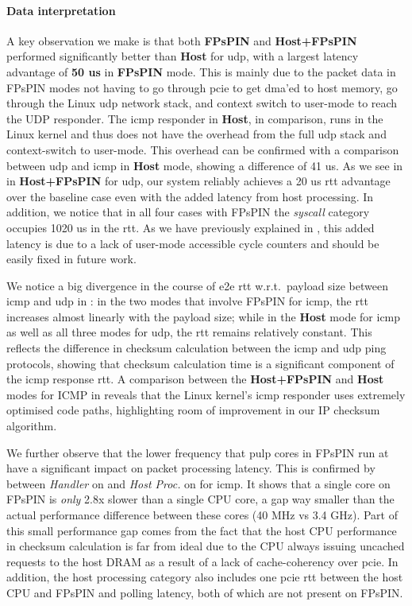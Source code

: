 \paragraph{Data interpretation} A key observation we make is that both \textbf{FPsPIN} and \textbf{Host+FPsPIN} performed significantly better than \textbf{Host} for \ac{udp}, with a largest latency advantage of \textbf{50 us} in \textbf{FPsPIN} mode.  This is mainly due to the packet data in FPsPIN modes not having to go through \ac{pcie} to get \ac{dma}'ed to host memory, go through the Linux \ac{udp} network stack, and context switch to user-mode to reach the UDP responder.  The \ac{icmp} responder in \textbf{Host}, in comparison, runs in the Linux kernel and thus does not have the overhead from the full \ac{udp} stack and context-switch to user-mode.  This overhead can be confirmed with a comparison between \ac{udp} and \ac{icmp} in \textbf{Host} mode, showing a difference of \mytilde{}41 us.  As we see in  in \textbf{Host+FPsPIN} for \ac{udp}, our system reliably achieves a \mytilde{}20 us \ac{rtt} advantage over the baseline case even with the added latency from host processing.  In addition, we notice that in all four cases with FPsPIN the \emph{syscall} category occupies 10\mytilde{}20 us in the \ac{rtt}.  As we have previously explained in , this added latency is due to a lack of user-mode accessible cycle counters and should be easily fixed in future work.

We notice a big divergence in the course of \ac{e2e} \ac{rtt} w.r.t.\ payload size between \ac{icmp} and \ac{udp} in : in the two modes that involve FPsPIN for \ac{icmp}, the \ac{rtt} increases almost linearly with the payload size; while in the \textbf{Host} mode for \ac{icmp} as well as all three modes for \ac{udp},  the \ac{rtt} remains relatively constant.  This reflects the difference in checksum calculation between the \ac{icmp} and \ac{udp} ping protocols, showing that checksum calculation time is a significant component of the \ac{icmp} response \ac{rtt}.  A comparison between the \textbf{Host+FPsPIN} and \textbf{Host} modes for ICMP in  reveals that the Linux kernel's \ac{icmp} responder uses extremely optimised code paths, highlighting room of improvement in our IP checksum algorithm.

We further observe that the lower frequency that \ac{pulp} cores in FPsPIN run at have a significant impact on packet processing latency.  This is confirmed by  between \emph{Handler} on  and \emph{Host Proc.} on  for \ac{icmp}.  It shows that a single core on FPsPIN is \emph{only} \mytilde{}2.8x slower than a single CPU core, a gap way smaller than the actual performance difference between these cores (40 MHz vs 3.4 GHz).  Part of this small performance gap comes from the fact that the host CPU performance in checksum calculation is far from ideal due to the CPU always issuing uncached requests to the host DRAM as a result of a lack of cache-coherency over \ac{pcie}.  In addition, the host processing category also includes one \ac{pcie} \ac{rtt} between the host CPU and FPsPIN and polling latency, both of which are not present on FPsPIN.

